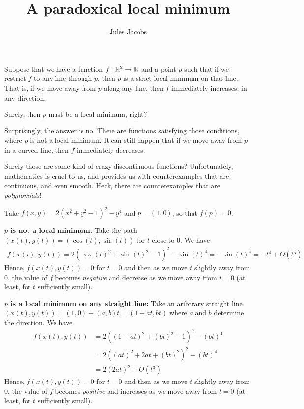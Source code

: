 

\newcommand{\tac}[1]{\lstinline[mathescape]~#1~}
\newcommand{\ciff}{\ \leftrightarrow\ }
\newcommand{\hyp}{\tac{H}}
\newcommand{\hypB}{\tac{G}}
\newcommand{\var}{\tac{x}}
\newcommand{\varB}{\tac{y}}

\newtheorem*{nlemma}{Lemma}


\title{A paradoxical local minimum}
\author{Jules Jacobs}


\maketitle
Suppose that we have a function $f : \mathbb{R}^2 \to \mathbb{R}$ and a point $p$ such that if we restrict $f$ to any line through $p$, then $p$ is a strict local minimum on that line.
That is, if we move away from $p$ along any line, then $f$ immediately increases, in any direction.

Surely, then $p$ must be a local minimum, right?

Surprisingly, the answer is no. There are functions satisfying those conditions, where $p$ is not a local minimum.
It can still happen that if we move away from $p$ in a curved line, then $f$ immediately decreases.

Surely those are some kind of crazy discontinuous functions?
Unfortunately, mathematics is cruel to us, and provides us with counterexamples that are continuous, and even smooth. Heck, there are counterexamples that are \emph{polynomials}!

Take $f(x,y) = 2(x^2 + y^2 - 1)^2 - y^4$ and $p = (1,0)$, so that $f(p) = 0$.

\textbf{$p$ is not a local minimum:}
Take the path $(x(t),y(t)) = (\cos(t),\sin(t))$ for $t$ close to $0$. We have
\begin{align*}
  f(x(t),y(t)) = 2(\cos(t)^2 + \sin(t)^2 - 1)^2 - \sin(t)^4 = -\sin(t)^4 = -t^4 + O(t^5)
\end{align*}
Hence, $f(x(t),y(t)) = 0$ for $t = 0$ and then as we move $t$ slightly away from $0$, the value of $f$ becomes \emph{negative} and decrease as we move away from $t=0$ (at least, for $t$ sufficiently small).

\textbf{$p$ is a local minimum on any straight line:}
Take an aribtrary straight line $(x(t),y(t)) = (1,0) + (a,b)t = (1 + at, bt)$ where $a$ and $b$ determine the direction. We have
\begin{align*}
  f(x(t),y(t))
    &= 2((1 + at)^2 + (bt)^2 - 1)^2 - (bt)^4 \\
    &= 2((at)^2 + 2at + (bt)^2)^2 - (bt)^4 \\
    &= 2(2at)^2 + O(t^3)
\end{align*}
Hence, $f(x(t),y(t)) = 0$ for $t = 0$ and then as we move $t$ slightly away from $0$, the value of $f$ becomes \emph{positive} and increases as we move away from $t=0$ (at least, for $t$ sufficiently small).

